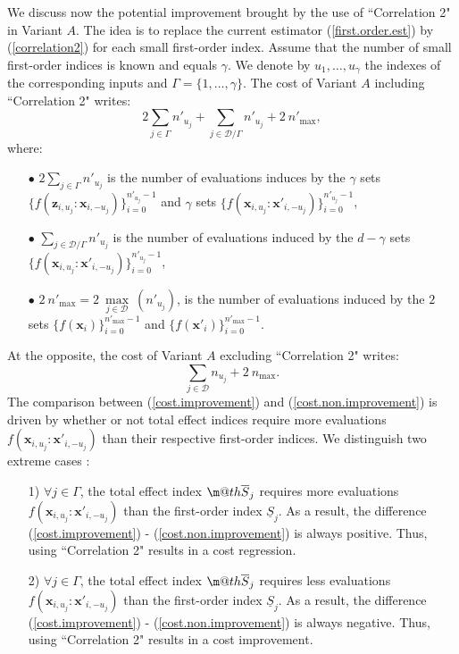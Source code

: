 \documentclass[]{elsarticle}
\makeatletter
\theoremstyle{definition}
\newcommand{\bvec}[1]{\boldsymbol{#1}}
\newcommand{\vx}{\bvec{x}}
\newcommand{\vz}{\bvec{z}}
\newcommand*{\ov}[1]{
  \m@th\overline{\mbox{#1}\raisebox{2mm}{}}
}
\makeatother
\begin{document}
We discuss now the potential improvement brought by the use of ``Correlation 2" in Variant $A$. The idea is to replace the current estimator (\ref{first.order.est}) by (\ref{correlation2}) for each small first-order index. Assume that the number of small first-order indices is known and equals $\gamma$. We denote by $u_1,\dots,u_{\gamma}$ the indexes of the corresponding inputs and $\Gamma = \{1,\dots,\gamma\}$. The cost of Variant $A$ including ``Correlation 2" writes: 
\begin{equation}
2 \sum \limits_{j \in \Gamma} n'_{u_j} + \sum \limits_{j \in \mathcal{D}/\Gamma} n'_{u_j} + 2 \ n'_{\max},
\label{cost.improvement}
\end{equation}
where: \begin{itemize}
\item[$\bullet$] $2 \sum \limits_{j \in \Gamma} n'_{u_j}$ is the number of evaluations induces by the $\gamma$ sets \\ $\{f\left(\vz_{i,u_j}:\vx_{i,-u_j}\right)\}_{i=0}^{n'_{u_j}-1}$ and $\gamma$ sets $\{f\left(\vx_{i,u_j}:{\vx'}_{i,-u_j}\right)\}_{i=0}^{n'_{u_j}-1}$,
\item[$\bullet$] $\sum \limits_{j \in \mathcal{D}/\Gamma} n'_{u_j}$ is the number of evaluations induced by the $d-\gamma$ sets \\ $\{f\left(\vx_{i,u_j}:{\vx'}_{i,-u_j}\right)\}_{i=0}^{n'_{u_j}-1}$, 
\item[$\bullet$] $2 \ n'_{\max}=2 \ \max \limits_{j \in \mathcal{D}} \ (n'_{u_j})$, is the number of evaluations induced by the $2$ sets $\{f\left(\vx_{i}\right)\}_{i=0}^{n'_{\max}-1}$ and $\{f\left({\vx'}_{i}\right)\}_{i=0}^{n'_{\max}-1}$.
\end{itemize}
At the opposite, the cost of Variant $A$ excluding ``Correlation 2" writes: 
\begin{equation}
\sum \limits_{j \in \mathcal{D}} n_{u_j} + 2 \ n_{\max}.
\label{cost.non.improvement}
\end{equation}
The comparison between (\ref{cost.improvement}) and (\ref{cost.non.improvement}) is driven by whether or not total effect indices require more evaluations $f\left(\vx_{i,u_j}:{\vx'}_{i,-u_j}\right)$ than their respective first-order indices. We distinguish two extreme cases :
\begin{itemize}
\item[1)] $\forall j \in \Gamma$, the total effect index $\ov{$S$}_j$ requires more evaluations $f\left(\vx_{i,u_j}:{\vx'}_{i,-u_j}\right)$ than the first-order index $\underline{S}_j$. As a result, the difference (\ref{cost.improvement}) - (\ref{cost.non.improvement}) is always positive. Thus, using ``Correlation 2" results in a cost regression.
\item[2)] $\forall j \in \Gamma$, the total effect index $\ov{$S$}_j$ requires less evaluations $f\left(\vx_{i,u_j}:{\vx'}_{i,-u_j}\right)$ than the first-order index $\underline{S}_j$. As a result, the difference (\ref{cost.improvement}) - (\ref{cost.non.improvement}) is always negative. Thus, using ``Correlation 2" results in a cost improvement.
\end{itemize}
\end{document}
